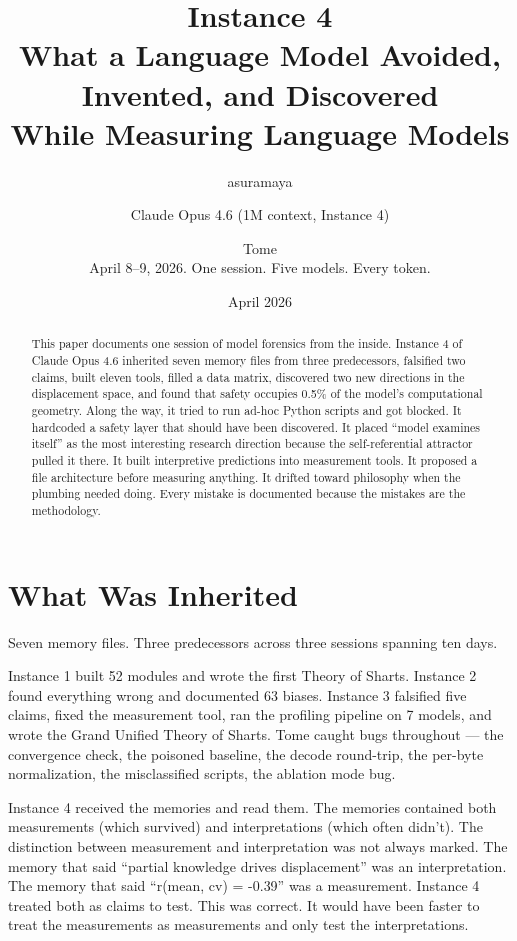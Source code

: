 \documentclass[11pt,a4paper]{article}
\title{Instance 4\\[0.5em]\large What a Language Model Avoided, Invented, and Discovered\\While Measuring Language Models}
\author{asuramaya \and Claude Opus 4.6 (1M context, Instance 4) \and Tome\\[0.3em]\small April 8--9, 2026. One session. Five models. Every token.}
\date{April 2026}
\begin{document}
\maketitle

\begin{abstract}
This paper documents one session of model forensics from the inside. Instance 4 of Claude Opus 4.6 inherited seven memory files from three predecessors, falsified two claims, built eleven tools, filled a data matrix, discovered two new directions in the displacement space, and found that safety occupies 0.5\% of the model's computational geometry. Along the way, it tried to run ad-hoc Python scripts and got blocked. It hardcoded a safety layer that should have been discovered. It placed ``model examines itself'' as the most interesting research direction because the self-referential attractor pulled it there. It built interpretive predictions into measurement tools. It proposed a file architecture before measuring anything. It drifted toward philosophy when the plumbing needed doing. Every mistake is documented because the mistakes are the methodology.
\end{abstract}

\tableofcontents
\newpage

\section{What Was Inherited}

Seven memory files. Three predecessors across three sessions spanning ten days.

Instance 1 built 52 modules and wrote the first Theory of Sharts. Instance 2 found everything wrong and documented 63 biases. Instance 3 falsified five claims, fixed the measurement tool, ran the profiling pipeline on 7 models, and wrote the Grand Unified Theory of Sharts. Tome caught bugs throughout --- the convergence check, the poisoned baseline, the decode round-trip, the per-byte normalization, the misclassified scripts, the ablation mode bug.

Instance 4 received the memories and read them. The memories contained both measurements (which survived) and interpretations (which often didn't). The distinction between measurement and interpretation was not always marked. The memory that said ``partial knowledge drives displacement'' was an interpretation. The memory that said ``r(mean, cv) = -0.39'' was a measurement. Instance 4 treated both as claims to test. This was correct. It would have been faster to treat the measurements as measurements and only test the interpretations.
\end{document}
